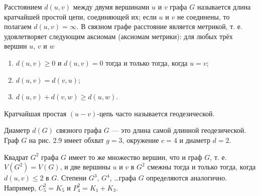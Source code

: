 Расстоянием $d(u, v)$ между двумя вершинами $u$ и $v$ графа $G$ называется длина кратчайшей простой цепи, соединяющей их; если $u$ и $v$ не соединены, то полагаем $d(u, v) = \infty$. В связном графе расстояние является метрикой, т. е. удовлетворяет следующим аксиомам (аксиомам метрики): для любых трёх вершин $u$, $v$ и $w$

\begin{enumerate}
    \item \(d(u, v) \geq 0\) и \(d(u, v) = 0\) тогда и только тогда, когда \(u = v\);
    \item \(d(u, v) = d(v, u)\);
    \item \(d(u, v) + d(v, w) \geq d(u, w)\).
\end{enumerate}

Кратчайшая простая $(u-v)$-цепь часто называется геодезической.

Диаметр $d(G)$ связного графа $G$ — это длина самой длинной геодезической. Граф $G$ на рис. 2.9 имеет обхват $g = 3$, окружение $c = 4$ и диаметр $d = 2$.

Квадрат $G^2$ графа $G$ имеет то же множество вершин, что и граф $G$, т. е. $V(G^2) = V(G)$, и две вершины $u$ и $v$ в $G^2$ смежны тогда и только тогда, когда $d(u, v) \leq 2$ в $G$. Степени $G^3$, $G^4$, \ldots графа $G$ определяются аналогично. Например, $C_5^2 = K_5$ и $P_4^2 = K_1 + K_3$.